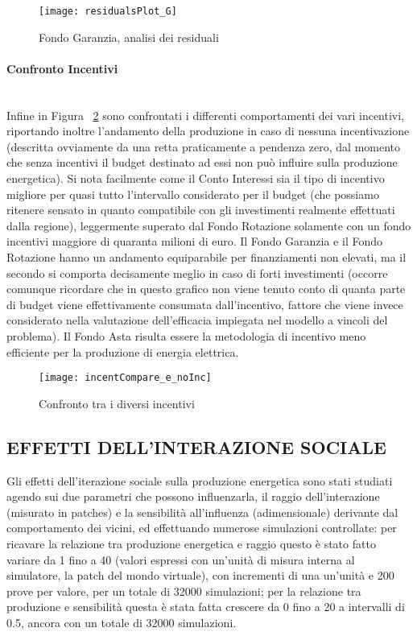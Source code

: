 \documentclass[12pt,a4paper,openright,twoside]{report}
\newcommand{\myparagraph}[1]{\paragraph{#1}\mbox{}\\}
\begin{document}
\begin{figure}[hbt]
	\centering
	\texttt{[image: residualsPlot\_G]}
	\caption{Fondo Garanzia, analisi dei residuali}
	\label{residualsPlot_G}
\end{figure}

\myparagraph{Confronto Incentivi}

Infine in Figura ~\ref{incentCompare} sono confrontati i differenti comportamenti dei vari incentivi, riportando inoltre l'andamento della produzione in caso di nessuna incentivazione (descritta ovviamente da una retta praticamente a pendenza zero, dal momento che senza incentivi il budget destinato ad essi non può influire sulla produzione energetica). Si nota facilmente come il Conto Interessi sia il tipo di incentivo migliore per quasi tutto l'intervallo considerato per il budget (che possiamo ritenere sensato in quanto compatibile con gli investimenti realmente effettuati dalla regione), leggermente superato dal Fondo Rotazione solamente con un fondo incentivi maggiore di quaranta milioni di euro. Il Fondo Garanzia e il Fondo Rotazione hanno un andamento equiparabile per finanziamenti non elevati, ma il secondo si comporta decisamente meglio in caso di forti investimenti (occorre comunque ricordare che in questo grafico non viene tenuto conto di quanta parte di budget viene effettivamente consumata dall'incentivo, fattore che viene invece considerato nella valutazione dell'efficacia impiegata nel modello a vincoli del problema). Il Fondo Asta risulta essere la metodologia di incentivo meno efficiente per la produzione di energia elettrica.

\begin{figure}[hbt]
	\centering
	\texttt{[image: incentCompare\_e\_noInc]}
	\caption{Confronto tra i diversi incentivi}
	\label{incentCompare}
\end{figure}

\subsection{EFFETTI DELL'INTERAZIONE SOCIALE}

Gli effetti dell'iterazione sociale sulla produzione energetica sono stati studiati agendo sui due parametri che possono influenzarla, il raggio dell'interazione (misurato in patches) e la sensibilità all'influenza (adimensionale) derivante dal comportamento dei vicini, ed effettuando numerose simulazioni controllate: per ricavare la relazione tra produzione energetica e raggio questo è stato fatto variare da 1 fino a 40 (valori espressi con un'unità di misura interna al simulatore, la patch del mondo virtuale), con incrementi di una un'unità e 200 prove per valore, per un totale di 32000 simulazioni; per la relazione tra produzione e sensibilità questa è stata fatta crescere da 0 fino a 20 a intervalli di 0.5, ancora con un totale di 32000 simulazioni.
\end{document}
